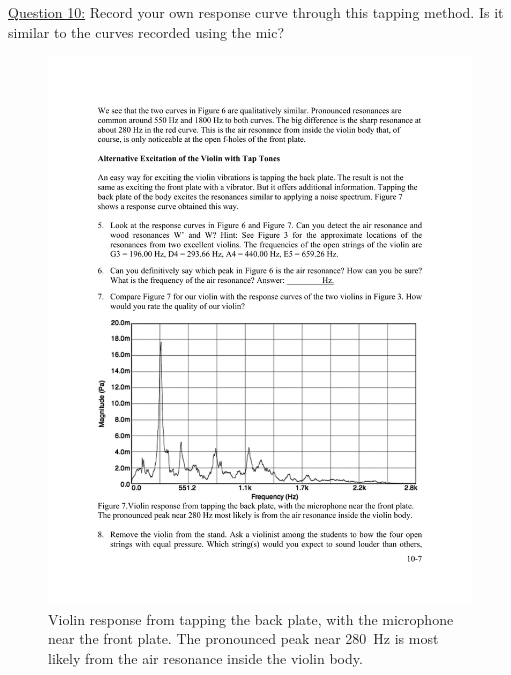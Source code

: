 \documentclass[11pt]{NSF}
\begin{document}
\underline{Question 10:} Record your own response curve through this tapping method. Is it similar to the curves recorded using the mic?
%
\begin{figure}[hbtp]
\begin{center}
\includegraphics[width=.7\textwidth]{fig10_7}
\caption{Violin response from tapping the back plate, with the microphone near
the front plate. The pronounced peak near 280~Hz is most likely from
the air resonance inside the violin body.}
\label{f:7}
\end{center}
\end{figure}
%
\
\end{document}
